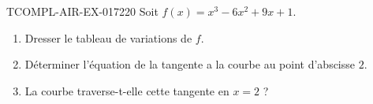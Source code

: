\begin{exercice}{TCOMPL-AIR-EX-017}{2}{20}
Soit $f(x) = x^3 - 6x^2 + 9x + 1$.
\begin{enumerate}
  \item Dresser le tableau de variations de $f$.
  \item Déterminer l'équation de la tangente a la courbe au point d'abscisse $2$.
  \item La courbe traverse-t-elle cette tangente en $x = 2$ ?
\end{enumerate}

\end{exercice}
